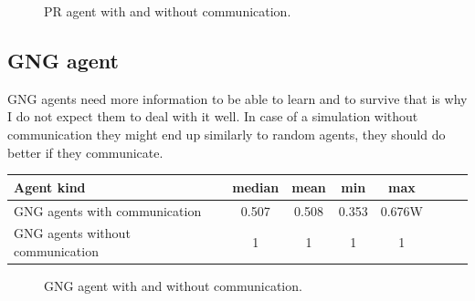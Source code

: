 
\begin{figure}[h!]
  \centering       
  \caption{PR agent with and without communication.}
\end{figure} 

\clearpage

\subsection{GNG agent}

GNG agents need more information to be able to learn and to survive that is why I do not expect them to deal with it well. In case of a simulation without communication they might end up similarly to random agents, they should do better if they communicate.

\begin{center}   
  \begin{tabular}{l*{6}{c}r}
  Agent kind        & median & mean & min & max \\
  \hline  
  GNG agents with communication        & 0.507 & 0.508 & 0.353 & 0.676W \\
  GNG agents without communication        & 1 & 1 & 1 & 1 \\
  \end{tabular}                  
\end{center}


\begin{figure}[h!]
  \centering      
  \caption{GNG agent with and without communication.}
\end{figure} 

\clearpage

